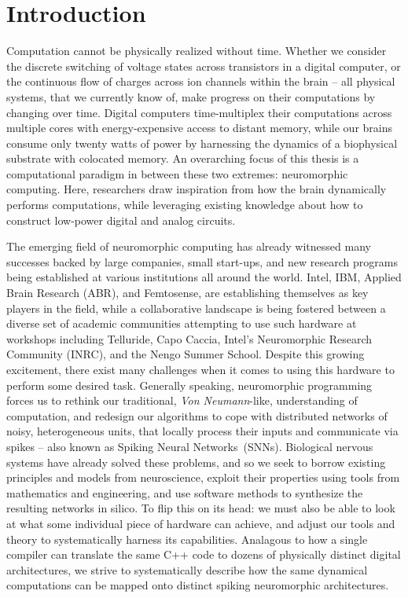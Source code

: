 \chapter{Introduction}

Computation cannot be physically realized without time.
Whether we consider the discrete switching of voltage states across transistors in a
digital computer,
or the continuous flow of charges across ion channels within the brain -- 
all physical systems, that we currently know of, make progress on their computations
by changing over time.
Digital computers time-multiplex their computations across multiple cores with energy-expensive access to distant memory, while our brains consume only twenty watts of power by harnessing the dynamics of a biophysical substrate with colocated memory.
An overarching focus of this thesis is a computational paradigm
in between these two extremes: neuromorphic computing.
Here, researchers draw inspiration from how the
brain dynamically performs computations, while leveraging existing knowledge about
how to construct low-power digital and analog circuits.

The emerging field of neuromorphic computing has already
witnessed many successes backed by large companies, small start-ups, and new research
programs being established at various institutions all around the world.
Intel, IBM, Applied Brain Research (ABR), and Femtosense, are establishing themselves as key players in the field, while a collaborative landscape is being fostered between a diverse set of academic communities attempting to use such hardware at workshops including Telluride, Capo Caccia, Intel's Neuromorphic Research Community (INRC), and the Nengo Summer School.
Despite this growing excitement, there exist many challenges when it comes to using
this hardware to perform some desired task.
Generally speaking, neuromorphic programming forces us to rethink our traditional,
\emph{Von Neumann}-like, understanding of computation, and redesign our algorithms to cope with distributed networks of noisy, heterogeneous units, that locally process their inputs and communicate via spikes -- also known as Spiking Neural Networks~(SNNs).
Biological nervous systems have already solved these problems, and so we seek to borrow existing
principles and models from neuroscience, exploit their properties using tools from mathematics and engineering,
and use software methods to synthesize the resulting networks in silico.
To flip this on its head: we must also be able to look at what some individual piece of hardware can achieve,
and adjust our tools and theory to systematically harness its capabilities.
Analagous to how a single compiler can translate the same C++ code
to dozens of physically distinct digital architectures, we strive to systematically describe
how the same dynamical computations can be mapped onto distinct spiking neuromorphic architectures.

